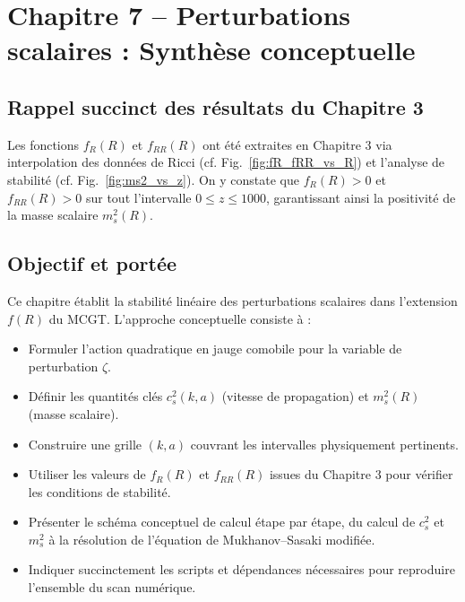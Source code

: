 \section{Chapitre 7 – Perturbations scalaires : Synthèse conceptuelle}

\subsection{Rappel succinct des résultats du Chapitre 3}
Les fonctions \(f_{R}(R)\) et \(f_{RR}(R)\) ont été extraites en Chapitre 3 via interpolation des données de Ricci (cf. Fig.~\ref{fig:fR_fRR_vs_R}) et l’analyse de stabilité (cf. Fig.~\ref{fig:ms2_vs_z}).
On y constate que \(f_{R}(R)>0\) et \(f_{RR}(R)>0\) sur tout l’intervalle \(0\le z\le1000\), garantissant ainsi la positivité de la masse scalaire \(m_{s}^{2}(R)\).

\subsection{Objectif et portée}
Ce chapitre établit la stabilité linéaire des perturbations scalaires dans l’extension \(f(R)\) du MCGT. L’approche conceptuelle consiste à :
\begin{itemize}
  \item Formuler l’action quadratique en jauge comobile pour la variable de perturbation \(\zeta\).
  \item Définir les quantités clés \(c_{s}^{2}(k,a)\) (vitesse de propagation) et \(m_{s}^{2}(R)\) (masse scalaire).
  \item Construire une grille \((k,a)\) couvrant les intervalles physiquement pertinents.
  \item Utiliser les valeurs de \(f_{R}(R)\) et \(f_{RR}(R)\) issues du Chapitre 3 pour vérifier les conditions de stabilité.
  \item Présenter le schéma conceptuel de calcul étape par étape, du calcul de \(c_{s}^{2}\) et \(m_{s}^{2}\) à la résolution de l’équation de Mukhanov–Sasaki modifiée.
  \item Indiquer succinctement les scripts et dépendances nécessaires pour reproduire l’ensemble du scan numérique.
\end{itemize}

